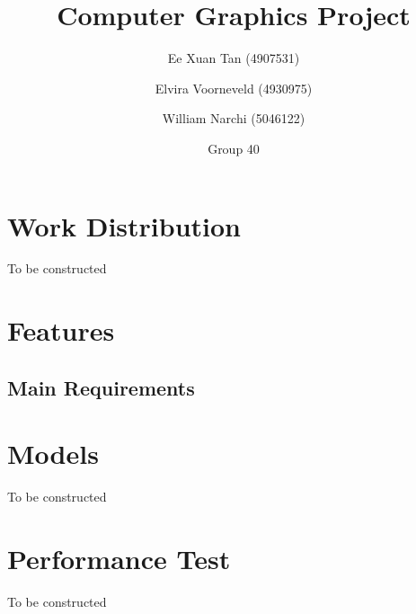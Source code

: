 \documentclass{article}
\author{Ee Xuan Tan (4907531) \and Elvira Voorneveld (4930975) \and William Narchi (5046122)}
\date{Group 40} %
\title{Computer Graphics Project}
\begin{document}
    \maketitle

    \section{Work Distribution}
    To be constructed

    \section{Features}
    \subsection{Main Requirements}

    \section{Models}
    To be constructed

    \section{Performance Test}
    To be constructed
\end{document}
